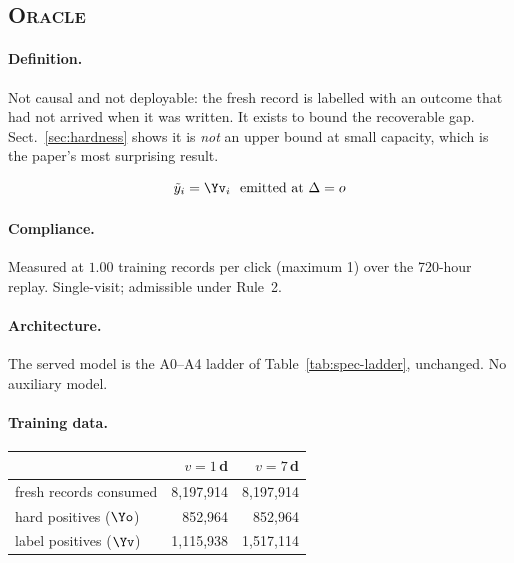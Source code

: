 \subsection{\textsc{Oracle}}\label{app:m-Oracle}

\paragraph{Definition.} Not causal and not deployable: the fresh record is labelled with an outcome that had
   not arrived when it was written. It exists to bound the recoverable gap. Sect.~\ref{sec:hardness}
   shows it is \emph{not} an upper bound at small capacity, which is the paper's most surprising
   result.

\begin{equation}
\tilde y_i = \Yv_i \ \text{ emitted at } \Delta=o
\end{equation}

\begin{center}\end{center}

\paragraph{Compliance.} Measured at $1.00$ training records per click (maximum 1) over the 720-hour replay. Single-visit; admissible under Rule~2.

\paragraph{Architecture.} The served model is the A0--A4 ladder of Table~\ref{tab:spec-ladder}, unchanged. No auxiliary model.

\paragraph{Training data.}
\begin{center}\small\begin{tabular}{lrr}
\toprule
 & $v=1$\,d & $v=7$\,d\\
\midrule
fresh records consumed & 8{,}197{,}914 & 8{,}197{,}914\\
hard positives ($\Yo$) & 852{,}964 & 852{,}964\\
label positives ($\Yv$) & 1{,}115{,}938 & 1{,}517{,}114\\
\bottomrule
\end{tabular}\end{center}

